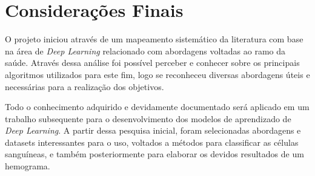 \chapter{Considerações Finais}
\label{chap:conclusoes}

O projeto iniciou através de um mapeamento sistemático da literatura com base na área de \emph{Deep Learning} relacionado com abordagens voltadas ao ramo da saúde. Através dessa análise foi possível perceber e conhecer sobre os principais algoritmos utilizados para este fim, logo se reconheceu diversas abordagens úteis e necessárias para a realização dos objetivos.

Todo o conhecimento adquirido e devidamente documentado será aplicado em um trabalho subsequente para o desenvolvimento dos modelos de aprendizado de \emph{Deep Learning}. A partir dessa pesquisa inicial, foram selecionadas abordagens e datasets interessantes para o uso, voltados a métodos para classificar as células sanguíneas, e também posteriormente para elaborar os devidos resultados de um hemograma.